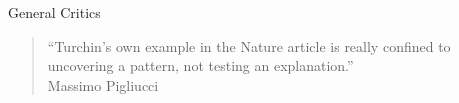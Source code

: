 \documentclass{beamer}
\begin{document}
\begin{frame}{General Critics}
    \begin{quote}
	``Turchin’s own example in the Nature article is really confined to uncovering a pattern, not testing an explanation.''\\
	Massimo Pigliucci
    \end{quote} 

\end{frame}


\begin{frame}
    \scriptsize
    
    
\end{frame}
\end{document}
